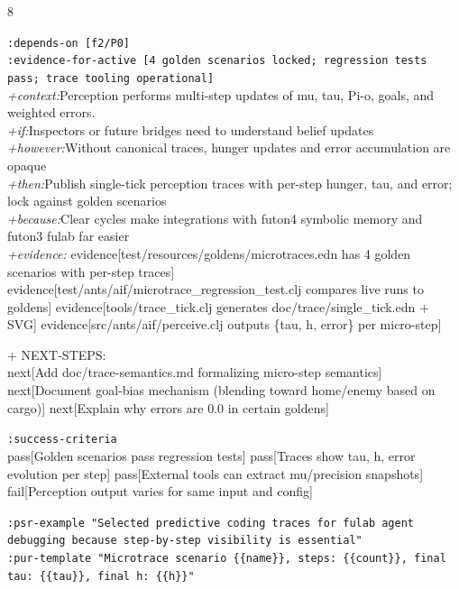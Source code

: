 \documentclass[landscape]{article}
\newcommand{\flexitag}[1]{\textcolor[gray]{0.35}{\textit{#1}}}
\newenvironment{devmapactive}{%
  \def\FrameCommand{\colorbox{devmapactivebg}}%
  \setlength{\fboxsep}{2pt}%
  \MakeFramed{\advance\hsize-\width \FrameRestore}%
}{\endMakeFramed}
\begin{document}
\begin{paracol}{8}
\begin{devmapactive}
  \texttt{:\allowbreak{}depends-\allowbreak{}on [f2/\allowbreak{}P0]}\\
  \texttt{:\allowbreak{}evidence-\allowbreak{}for-\allowbreak{}active [4 golden scenarios locked;\allowbreak{} regression tests pass;\allowbreak{} trace tooling operational]}\\
  \flexitag{+context:}Perception performs multi-step updates of mu, tau, Pi-o, goals, and weighted errors.\\
  \flexitag{+if:}Inspectors or future bridges need to understand belief updates\\
  \flexitag{+however:}Without canonical traces, hunger updates and error accumulation are opaque\\
  \flexitag{+then:}Publish single-tick perception traces with per-step hunger, tau, and error; lock against golden scenarios\\
  \flexitag{+because:}Clear cycles make integrations with futon4 symbolic memory and futon3 fulab far easier\\
  \flexitag{+evidence:} evidence[test/resources/goldens/microtraces.edn has 4 golden scenarios with per-step traces] evidence[test/ants/aif/microtrace\_regression\_test.clj compares live runs to goldens] evidence[tools/trace\_tick.clj generates doc/trace/single\_tick.edn + SVG] evidence[src/ants/aif/perceive.clj outputs \{tau, h, error\} per micro-step]\\
\par
  + NEXT-STEPS:\\
    next[Add doc/trace-semantics.md formalizing micro-step semantics] next[Document goal-bias mechanism (blending toward home/enemy based on cargo)] next[Explain why errors are 0.0 in certain goldens]\\
\par
  \texttt{:\allowbreak{}success-\allowbreak{}criteria}\\
    pass[Golden scenarios pass regression tests] pass[Traces show tau, h, error evolution per step] pass[External tools can extract mu/precision snapshots] fail[Perception output varies for same input and config]\\
\par
  \texttt{:\allowbreak{}psr-\allowbreak{}example "Selected predictive coding traces for fulab agent debugging because step-\allowbreak{}by-\allowbreak{}step visibility is essential"}\\
  \texttt{:\allowbreak{}pur-\allowbreak{}template "Microtrace scenario \{\{name\}\},\allowbreak{} steps:\allowbreak{} \{\{count\}\},\allowbreak{} final tau:\allowbreak{} \{\{tau\}\},\allowbreak{} final h:\allowbreak{} \{\{h\}\}"}\\

\end{devmapactive}
\end{paracol}
\end{document}
